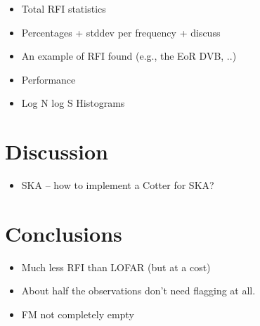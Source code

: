 \documentclass[useAMS,usenatbib]{mn2e}
\begin{document}
\begin{itemize}
 \item Total RFI statistics
 \item Percentages + stddev per frequency + discuss
 \item An example of RFI found (e.g., the EoR DVB, ..)
 \item Performance
 \item Log N log S Histograms
\end{itemize}

\section{Discussion}
\begin{itemize}
 \item SKA -- how to implement a Cotter for SKA?
\end{itemize}

\section{Conclusions}
\begin{itemize}
 \item Much less RFI than LOFAR (but at a cost)
 \item About half the observations don't need flagging at all. 
 \item FM not completely empty
\end{itemize}
\end{document}
